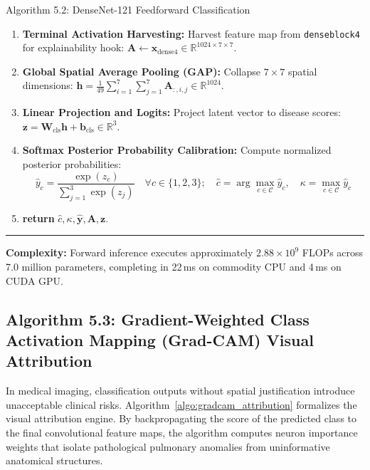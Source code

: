 \documentclass[12pt,a4paper]{report}
\begin{document}
\begin{algoBox}{Algorithm 5.2: DenseNet-121 Feedforward Classification}
\begin{enumerate}[1:]
\begin{equation*}
    \end{equation*}
  \item \textbf{Terminal Activation Harvesting:} Harvest feature map from \texttt{denseblock4} for explainability hook: $\mathbf{A} \leftarrow \mathbf{x}_{\text{dense4}} \in \mathbb{R}^{1024 \times 7 \times 7}$.
  \item \textbf{Global Spatial Average Pooling (GAP):} Collapse $7\times 7$ spatial dimensions: $\mathbf{h} = \frac{1}{49} \sum_{i=1}^7 \sum_{j=1}^7 \mathbf{A}_{:, i, j} \in \mathbb{R}^{1024}$.
  \item \textbf{Linear Projection and Logits:} Project latent vector to disease scores: $\mathbf{z} = \mathbf{W}_{\text{cls}} \mathbf{h} + \mathbf{b}_{\text{cls}} \in \mathbb{R}^3$.
  \item \textbf{Softmax Posterior Probability Calibration:} Compute normalized posterior probabilities:
    \begin{equation*}
      \hat{y}_c = \frac{\exp(z_c)}{\sum_{j=1}^3 \exp(z_j)} \quad \forall c \in \{1, 2, 3\}; \quad \hat{c} = \arg\max_{c \in \mathcal{C}} \hat{y}_c, \quad \kappa = \max_{c \in \mathcal{C}} \hat{y}_c
    \end{equation*}
  \item \textbf{return} $\hat{c}, \kappa, \hat{\mathbf{y}}, \mathbf{A}, \mathbf{z}$.
\end{enumerate}
\noindent\rule{\linewidth}{0.4pt}
\textbf{Complexity:} Forward inference executes approximately $2.88 \times 10^9$ FLOPs across 7.0 million parameters, completing in 22\,ms on commodity CPU and 4\,ms on CUDA GPU.
\end{algoBox}

\subsection{Algorithm 5.3: Gradient-Weighted Class Activation Mapping (Grad-CAM) Visual Attribution}
In medical imaging, classification outputs without spatial justification introduce unacceptable clinical risks. Algorithm~\ref{algo:gradcam_attribution} formalizes the visual attribution engine. By backpropagating the score of the predicted class to the final convolutional feature maps, the algorithm computes neuron importance weights that isolate pathological pulmonary anomalies from uninformative anatomical structures.
\end{document}
